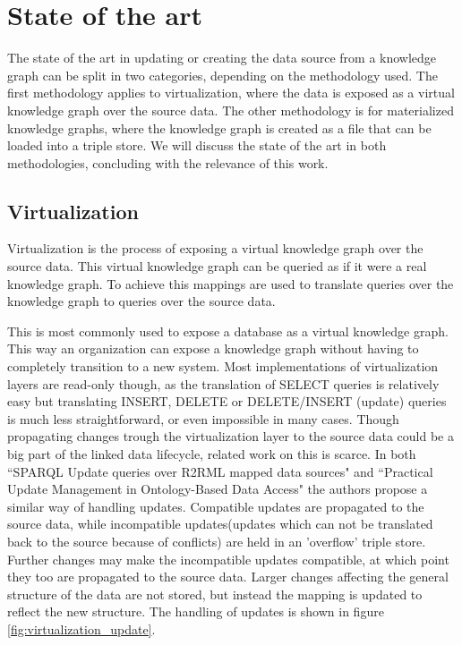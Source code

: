 
\section{State of the art}
The state of the art in updating or creating the data source from a knowledge graph can be split in two categories, depending on the methodology used. The first methodology applies to virtualization, where the data is exposed as a virtual knowledge graph over the source data. The other methodology is for materialized knowledge graphs, where the knowledge graph is created as a file that can be loaded into a triple store. We will discuss the state of the art in both methodologies, concluding with the relevance of this work.

\subsection{Virtualization}
Virtualization is the process of exposing a virtual knowledge graph over the source data. This virtual knowledge graph can be queried as if it were a real knowledge graph. To achieve this mappings are used to translate queries over the knowledge graph to queries over the source data.

This is most commonly used to expose a database as a virtual knowledge graph. This way an organization can expose a knowledge graph without having to completely transition to a new system. Most implementations of virtualization layers are read-only though, as the translation of SELECT queries is relatively easy but translating INSERT, DELETE or DELETE/INSERT (update) queries is much less straightforward, or even impossible in many cases. Though propagating changes trough the virtualization layer to the source data could be a big part of the linked data lifecycle, related work on this is scarce. In both ``SPARQL Update queries over R2RML mapped data sources" \citep{unbehauen-k-2017--sparqlUpdate} and ``Practical Update Management in Ontology-Based Data Access" \citep{practical_update_management_in_ontology_based_data_access} the authors propose a similar way of handling updates. Compatible updates are propagated to the source data, while incompatible updates(updates which can not be translated back to the source because of conflicts) are held in an 'overflow' triple store. Further changes may make the incompatible updates compatible, at which point they too are propagated to the source data. Larger changes affecting the general structure of the data are not stored, but instead the mapping is updated to reflect the new structure. The handling of updates is shown in figure \ref{fig:virtualization_update}.

